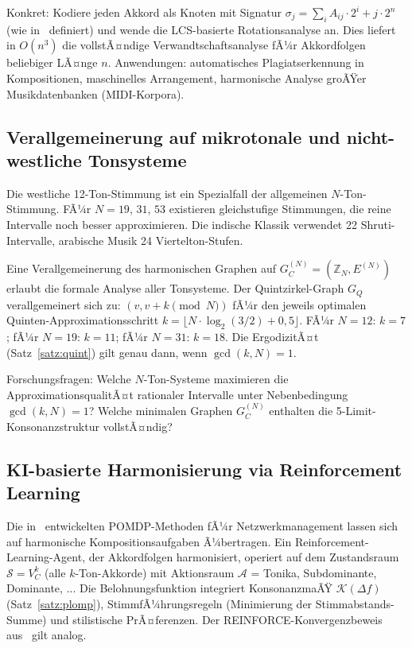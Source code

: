﻿\documentclass[a4paper,12pt]{article}
\theoremstyle{definition}
\begin{document}
Konkret: Kodiere jeden Akkord als Knoten mit Signatur $\sigma_j = \sum_{i} A_{ij}
\cdot 2^i + j \cdot 2^n$ (wie in~\cite{epp2026subgraph} definiert) und wende die
LCS-basierte Rotationsanalyse an. Dies liefert in $O(n^3)$ die vollstÃ¤ndige
Verwandtschaftsanalyse fÃ¼r Akkordfolgen beliebiger LÃ¤nge $n$. Anwendungen: automatisches
Plagiatserkennung in Kompositionen, maschinelles Arrangement, harmonische Analyse
groÃŸer Musikdatenbanken (MIDI-Korpora).

\subsection{Verallgemeinerung auf mikrotonale und nicht-westliche Tonsysteme}

Die westliche 12-Ton-Stimmung ist ein Spezialfall der allgemeinen $N$-Ton-Stimmung.
FÃ¼r $N = 19$, $31$, $53$ existieren gleichstufige Stimmungen, die reine Intervalle
noch besser approximieren. Die indische Klassik verwendet 22 Shruti-Intervalle,
arabische Musik 24 Viertelton-Stufen.

Eine Verallgemeinerung des harmonischen Graphen auf $G_C^{(N)} = (\mathbb{Z}_N, E^{(N)})$
erlaubt die formale Analyse aller Tonsysteme. Der Quintzirkel-Graph $G_Q$ verallgemeinert
sich zu: $(v, v + k \pmod{N})$ fÃ¼r den jeweils optimalen Quinten-Approximationsschritt
$k = \lfloor N \cdot \log_2(3/2) + 0{,}5 \rfloor$. FÃ¼r $N=12$: $k=7$; fÃ¼r $N=19$: $k=11$;
fÃ¼r $N=31$: $k=18$. Die ErgodizitÃ¤t (Satz~\ref{satz:quint}) gilt genau dann, wenn
$\gcd(k, N) = 1$.

Forschungsfragen: Welche $N$-Ton-Systeme maximieren die ApproximationsqualitÃ¤t
rationaler Intervalle unter Nebenbedingung $\gcd(k,N)=1$? Welche minimalen Graphen
$G_C^{(N)}$ enthalten die 5-Limit-Konsonanzstruktur vollstÃ¤ndig?

\subsection{KI-basierte Harmonisierung via Reinforcement Learning}

Die in~\cite{epp2026hetnet} entwickelten POMDP-Methoden fÃ¼r Netzwerkmanagement
lassen sich auf harmonische Kompositionsaufgaben Ã¼bertragen. Ein
Reinforcement-Learning-Agent, der Akkordfolgen harmonisiert, operiert auf dem
Zustandsraum $\mathcal{S} = V_C^k$ (alle $k$-Ton-Akkorde) mit Aktionsraum
$\mathcal{A}$ = {Tonika, Subdominante, Dominante, ..}. Die Belohnungsfunktion
integriert KonsonanzmaÃŸ $\mathcal{K}(\Delta f)$ (Satz~\ref{satz:plomp}),
StimmfÃ¼hrungsregeln (Minimierung der Stimmabstands-Summe) und stilistische
PrÃ¤ferenzen. Der REINFORCE-Konvergenzbeweis aus~\cite{epp2026hetnet} gilt analog.
\end{document}
